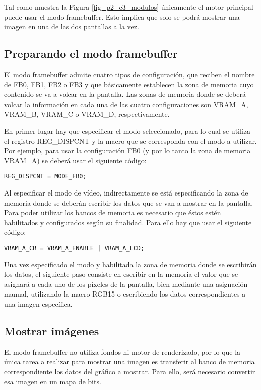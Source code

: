 Tal como muestra la Figura \ref{fig_p2_c3_modulos} únicamente el motor principal puede usar el modo framebuffer. Esto implica que solo se podrá mostrar una imagen en una de las dos pantallas a la vez.
\subsection{Preparando el modo framebuffer}
El modo framebuffer admite cuatro tipos de configuración, que reciben el nombre de FB0, FB1, FB2 o FB3 y que básicamente establecen la zona de memoria cuyo contenido se va a volcar en la pantalla. Las zonas de memoria donde se deberá volcar la información en cada una de las cuatro configuraciones son VRAM\_A, VRAM\_B, VRAM\_C o VRAM\_D, respectivamente.

En primer lugar hay que especificar el modo seleccionado, para lo cual se utiliza el registro REG\_DISPCNT y la macro que se corresponda con el modo a utilizar. Por ejemplo, para usar la configuración FB0 (y por lo tanto la zona de memoria VRAM\_A) se deberá usar el siguiente código:

\begin{verbatim}
REG_DISPCNT = MODE_FB0;
\end{verbatim}

Al especificar el modo de vídeo, indirectamente se está especificando la zona de memoria donde se deberán escribir los datos que se van a mostrar en la pantalla. Para poder utilizar los bancos de memoria es necesario que éstos estén habilitados y configurados según su finalidad. Para ello hay que usar el siguiente código:

\begin{verbatim}
VRAM_A_CR = VRAM_A_ENABLE | VRAM_A_LCD;
\end{verbatim}

Una vez especificado el modo y habilitada la zona de memoria donde se escribirán los datos, el siguiente paso consiste en escribir en la memoria el valor que se asignará a cada uno de los píxeles de la pantalla, bien mediante una asignación manual, utilizando la macro RGB15 o escribiendo los datos correspondientes a una imagen específica.

\subsection{Mostrar imágenes}
\label{sec:p2_c3_imagenes}
El modo framebuffer no utiliza fondos ni motor de renderizado, por lo que la única tarea a realizar para mostrar una imagen es transferir al banco de memoria correspondiente los datos del gráfico a mostrar. Para ello, será necesario convertir esa imagen en un mapa de bits.

